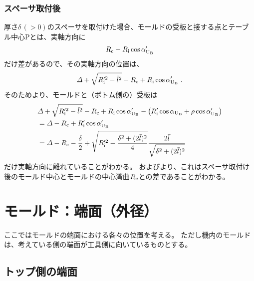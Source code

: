 \subsection{スペーサ取付後}
厚さ$\delta\,(>0)$のスペーサを取付けた場合、モールドの受板と接する点とテーブル中心Pとは、実軸方向に
\begin{align*}
  R_\text c-R_\text i\cos\alpha'_{\text U_\text B}
\end{align*}
だけ差があるので、その実軸方向の位置は、
\begin{align*}
  \varDelta+\sqrt{R_\text i'^2-\bar l^2}-R_\text c+R_\text i\cos\alpha'_{\text U_\text B}\ .
\end{align*}
そのためより、モールドと（ボトム側の）受板は
\begin{align*}
  &  \varDelta+\sqrt{R_\text i'^2-\bar l^2}-R_\text c+R_\text i\cos\alpha'_{\text U_\text B}
     -\left(R_\text i'\cos\alpha_{\text U_\text B}+\rho\cos\alpha'_{\text U_\text B}\right)\\
  &= \varDelta-R_\text c+R_\text i'\cos\alpha'_{\text U_\text B}\\
  &= \varDelta-R_\text c
     -\frac\delta2+\sqrt{R_\text i'^2-\frac{\delta^2+(2\bar l)^2}4}\frac{2\bar l}{\sqrt{\delta^2+(2\bar l)^2}}
\end{align*}
だけ実軸方向に離れていることがわかる。
およびより、これはスペーサ取付け後のモールド中心とモールドの中心湾曲$R_\text c$との差であることがわかる。





\chapter{モールド：端面（外径）}
ここではモールドの端面における各々の位置を考える。
ただし機内のモールドは、考えている側の端面が工具側に向いているものとする。




\section{トップ側の端面}



